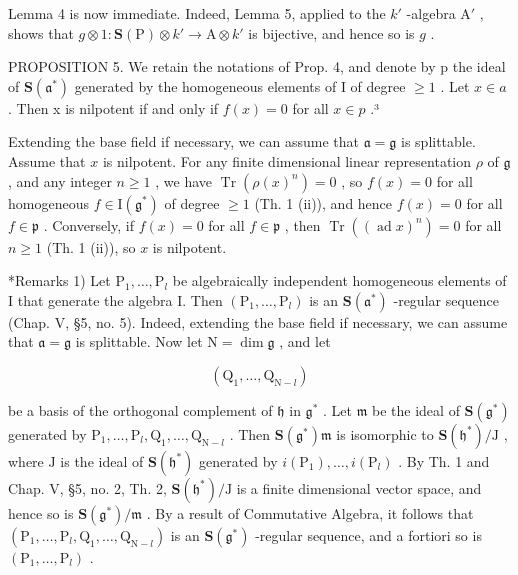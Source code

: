 Lemma 4 is now immediate. Indeed, Lemma 5, applied to the \(k'\) -algebra \(\mathrm{A}'\) , shows that \(g \otimes 1: \mathbf{S}(\mathrm{P}) \otimes k' \to \mathrm{A} \otimes k'\) is bijective, and hence so is \(g\) .

PROPOSITION 5. We retain the notations of Prop. 4, and denote by p the ideal of \(\mathbf{S}(\mathfrak{a}^{*})\) generated by the homogeneous elements of I of degree \(\geq 1\) . Let \(x \in a\) . Then x is nilpotent if and only if \(f(x) = 0\) for all \(x \in p\) .³

Extending the base field if necessary, we can assume that \(\mathfrak{a} = \mathfrak{g}\) is splittable. Assume that \(x\) is nilpotent. For any finite dimensional linear representation \(\rho\) of \(\mathfrak{g}\) , and any integer \(n \geq 1\) , we have \(\operatorname{Tr}(\rho(x)^n) = 0\) , so \(f(x) = 0\) for all homogeneous \(f \in \mathrm{I}(\mathfrak{g}^*)\) of degree \(\geq 1\) (Th. 1 (ii)), and hence \(f(x) = 0\) for all \(f \in \mathfrak{p}\) . Conversely, if \(f(x) = 0\) for all \(f \in \mathfrak{p}\) , then \(\operatorname{Tr}((\operatorname{ad} x)^n) = 0\) for all \(n \geq 1\) (Th. 1 (ii)), so \(x\) is nilpotent.

*Remarks 1) Let \(\mathrm{P}_1, \ldots, \mathrm{P}_l\) be algebraically independent homogeneous elements of I that generate the algebra I. Then \((\mathrm{P}_1, \ldots, \mathrm{P}_l)\) is an \(\mathbf{S}(\mathfrak{a}^*)\) -regular sequence (Chap. V, §5, no. 5). Indeed, extending the base field if necessary, we can assume that \(\mathfrak{a} = \mathfrak{g}\) is splittable. Now let \(\mathrm{N} = \dim \mathfrak{g}\) , and let

\[
\left(\mathrm{Q} _ {1}, \dots , \mathrm{Q} _ {\mathrm{N} - l}\right)
\]

be a basis of the orthogonal complement of \(\mathfrak{h}\) in \(\mathfrak{g}^*\) . Let \(\mathfrak{m}\) be the ideal of \(\mathbf{S}(\mathfrak{g}^*)\) generated by \(\mathrm{P}_1, \ldots, \mathrm{P}_l, \mathrm{Q}_1, \ldots, \mathrm{Q}_{\mathrm{N}-l}\) . Then \(\mathbf{S}(\mathfrak{g}^*)\mathfrak{m}\) is isomorphic to \(\mathbf{S}(\mathfrak{h}^*)/\mathrm{J}\) , where \(\mathrm{J}\) is the ideal of \(\mathbf{S}(\mathfrak{h}^*)\) generated by \(i(\mathrm{P}_1), \ldots, i(\mathrm{P}_l)\) . By Th. 1 and Chap. V, §5, no. 2, Th. 2, \(\mathbf{S}(\mathfrak{h}^*)/\mathrm{J}\) is a finite dimensional vector space, and hence so is \(\mathbf{S}(\mathfrak{g}^*)/\mathfrak{m}\) . By a result of Commutative Algebra, it follows that \((\mathrm{P}_1, \ldots, \mathrm{P}_l, \mathrm{Q}_1, \ldots, \mathrm{Q}_{\mathrm{N}-l})\) is an \(\mathbf{S}(\mathfrak{g}^*)\) -regular sequence, and a fortiori so is \((\mathrm{P}_1, \ldots, \mathrm{P}_l)\) .

